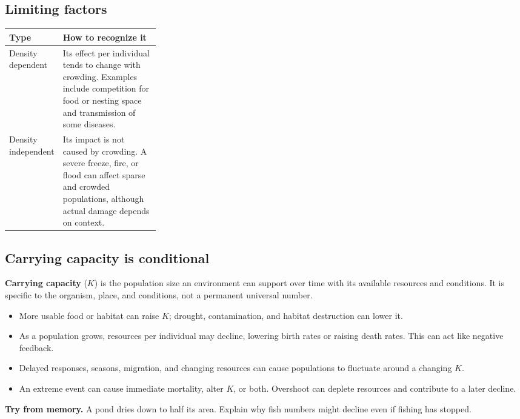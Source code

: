 \documentclass[11pt,letterpaper]{article}
\newcommand{\memorycheck}[1]{\par\smallskip\textbf{Try from memory.} #1\par}
\begin{document}
\subsection*{Limiting factors}
\par
\begin{tabularx}{\linewidth}{@{}p{0.29\linewidth}Y@{}}\toprule
Type & How to recognize it\\\midrule
Density dependent & Its effect per individual tends to change with crowding. Examples include competition for food or nesting space and transmission of some diseases.\\
Density independent & Its impact is not caused by crowding. A severe freeze, fire, or flood can affect sparse and crowded populations, although actual damage depends on context.\\\bottomrule
\end{tabularx}
\par
\subsection*{Carrying capacity is conditional}
\textbf{Carrying capacity} ($K$) is the population size an environment can support over time with its available resources and conditions. It is specific to the organism, place, and conditions, not a permanent universal number.
\begin{itemize}
\item More usable food or habitat can raise $K$; drought, contamination, and habitat destruction can lower it.
\item As a population grows, resources per individual may decline, lowering birth rates or raising death rates. This can act like negative feedback.
\item Delayed responses, seasons, migration, and changing resources can cause populations to fluctuate around a changing $K$.
\item An extreme event can cause immediate mortality, alter $K$, or both. Overshoot can deplete resources and contribute to a later decline.
\end{itemize}
\memorycheck{A pond dries down to half its area. Explain why fish numbers might decline even if fishing has stopped.}
\end{document}
